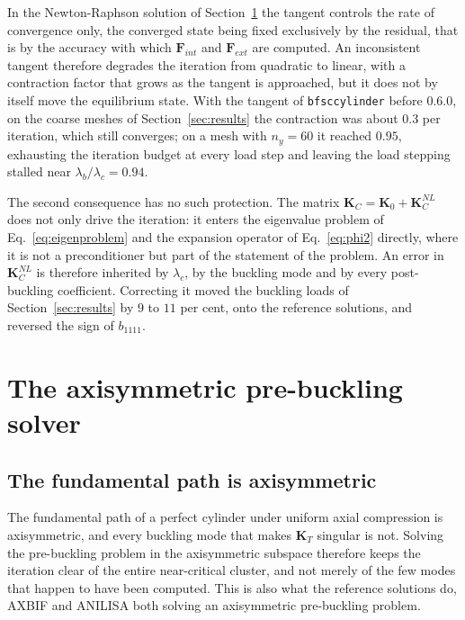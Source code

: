 \documentclass[11pt,a4paper]{article}
\begin{document}
In the Newton-Raphson solution of Section~\ref{sec:axisymmetric} the tangent
controls the rate of convergence only, the converged state being fixed
exclusively by the residual, that is by the accuracy with which
$\boldsymbol{F}_{int}$ and $\boldsymbol{F}_{ext}$ are computed.  An
inconsistent tangent therefore degrades the iteration from quadratic to
linear, with a contraction factor that grows as the tangent is approached, but
it does not by itself move the equilibrium state.  With the tangent of
\texttt{bfsccylinder} before 0.6.0, on the coarse meshes of
Section~\ref{sec:results} the contraction was about $0.3$ per iteration, which
still converges; on a mesh with $n_y = 60$ it reached $0.95$, exhausting
the iteration budget at every load step and leaving the load stepping stalled
near $\lambda_b/\lambda_c = 0.94$.

The second consequence has no such protection.  The matrix
$\boldsymbol{K}_C = \boldsymbol{K}_0 + \boldsymbol{K}_C^{NL}$ does not only
drive the iteration: it enters the eigenvalue problem of
Eq.~\ref{eq:eigenproblem} and the expansion operator of
Eq.~\ref{eq:phi2} directly, where it is not a preconditioner but part of the
statement of the problem.  An error in $\boldsymbol{K}_C^{NL}$ is therefore
inherited by $\lambda_c$, by the buckling mode and by every post-buckling
coefficient.  Correcting it moved the buckling loads of
Section~\ref{sec:results} by $9$ to $11$ per cent, onto the reference
solutions, and reversed the sign of $b_{1111}$.

\section{The axisymmetric pre-buckling solver}
\label{sec:axisymmetric}

\subsection{The fundamental path is axisymmetric}

The fundamental path of a perfect cylinder under uniform axial compression is
axisymmetric, and every buckling mode that makes $\boldsymbol{K}_T$ singular
is not.  Solving the pre-buckling problem in the axisymmetric subspace
therefore keeps the iteration clear of the entire near-critical cluster, and
not merely of the few modes that happen to have been computed.  This is also
what the reference solutions do, AXBIF and ANILISA both solving an
axisymmetric pre-buckling problem.
\end{document}
